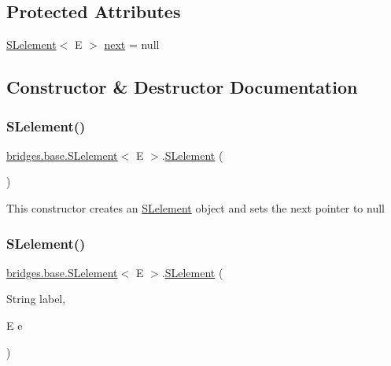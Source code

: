 \subsection*{Protected Attributes}
\begin{DoxyCompactItemize}
\item 
\mbox{\hyperlink{classbridges_1_1base_1_1_s_lelement}{S\+Lelement}}$<$ E $>$ \mbox{\hyperlink{classbridges_1_1base_1_1_s_lelement_abf61c96a74ad319d561c6952ea388e0e}{next}} = null
\end{DoxyCompactItemize}


\subsection{Constructor \& Destructor Documentation}
\mbox{\label{classbridges_1_1base_1_1_s_lelement_ab9c8a08dadd76d7e0c29d7c41cf277c4}} 
\subsubsection{\texorpdfstring{S\+Lelement()}{SLelement()}\hspace{0.1cm}{\footnotesize\ttfamily [1/5]}}
{\footnotesize\ttfamily \mbox{\hyperlink{classbridges_1_1base_1_1_s_lelement}{bridges.\+base.\+S\+Lelement}}$<$ E $>$.\mbox{\hyperlink{classbridges_1_1base_1_1_s_lelement}{S\+Lelement}} (\begin{DoxyParamCaption}{ }\end{DoxyParamCaption})}

This constructor creates an \mbox{\hyperlink{classbridges_1_1base_1_1_s_lelement}{S\+Lelement}} object and sets the next pointer to null \mbox{\label{classbridges_1_1base_1_1_s_lelement_a8e32c9b9e8fc8f9f1eccb14b97e031e7}} 
\subsubsection{\texorpdfstring{S\+Lelement()}{SLelement()}\hspace{0.1cm}{\footnotesize\ttfamily [2/5]}}
{\footnotesize\ttfamily \mbox{\hyperlink{classbridges_1_1base_1_1_s_lelement}{bridges.\+base.\+S\+Lelement}}$<$ E $>$.\mbox{\hyperlink{classbridges_1_1base_1_1_s_lelement}{S\+Lelement}} (\begin{DoxyParamCaption}\item[{String}]{label,  }\item[{E}]{e }\end{DoxyParamCaption})}

